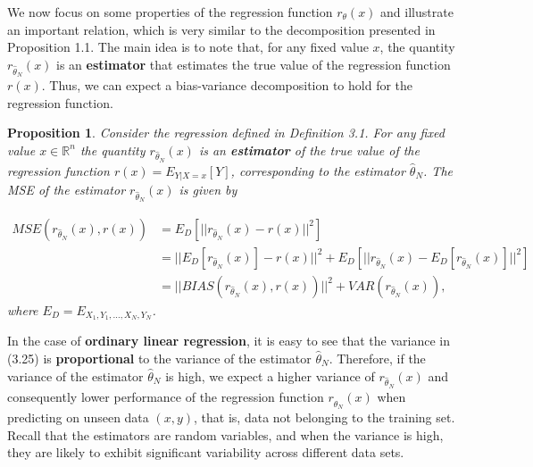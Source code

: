\documentclass{report}
\newtheorem{proposition}{Proposition}[chapter]
\begin{document}
We now focus on some properties of the regression function $r_\theta(x)$ and illustrate an important relation, which is very similar to the decomposition presented in Proposition 1.1. The main idea is to note that, for any fixed value $x$, the quantity $r_{\hat{\theta}_N}(x)$ is an \textbf{estimator} that estimates the true value of the regression function $r(x)$. Thus, we can expect a bias-variance decomposition to hold for the regression function.

\begin{proposition}
Consider the regression defined in Definition 3.1. For any fixed value $x \in \mathbb{R}^n$ the quantity $r_{\hat{\theta}_N}(x)$ is an \textbf{estimator} of the true value of the regression function $r(x) = E_{Y|X = x}[Y]$, corresponding to the estimator $\hat{\theta}_N$. The MSE of the estimator $r_{\hat{\theta}_N}(x)$ is given by

\begin{equation}
\begin{split}
MSE(r_{\hat{\theta}_N}(x),r(x)) &= E_D[||r_{\hat{\theta}_N}(x) - r(x)||^2] \\
&=||E_D[r_{\hat{\theta}_N}(x)] - r(x)||^2+E_D[||r_{\hat{\theta}_N}(x) - E_D[r_{\hat{\theta}_N}(x)]||^2]\\
&=||BIAS(r_{\hat{\theta}_N}(x), r(x))||^2 + VAR(r_{\hat{\theta}_N}(x)),
\end{split}
\end{equation}
where $E_D = E_{X_1,Y_1,\dots,X_N,Y_N}$.
\end{proposition}
In the case of \textbf{ordinary linear regression}, it is easy to see that the variance in (3.25) is \textbf{proportional} to the variance of the estimator $\hat{\theta}_N$. Therefore, if the variance of the estimator $\hat{\theta}_N$ is high, we expect a higher variance of $r_{\hat{\theta}_N}(x)$ and consequently lower performance of the regression function $r_{\hat{\theta}_N}(x)$ when predicting on unseen data $(x, y)$, that is, data not belonging to the training set. Recall that the estimators are random variables, and when the variance is high, they are likely to exhibit significant variability across different data sets.
\end{document}
